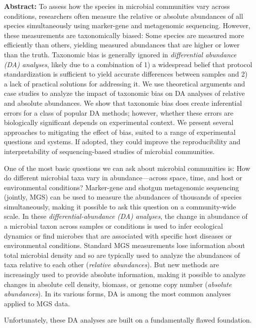 \documentclass[
]{article}
\begin{document}
\leavevmode{}%
\textbf{Abstract:}
To assess how the species in microbial communities vary across conditions, researchers often measure the relative or absolute abundances of all species simultaneously using marker-gene and metagenomic sequencing.
However, these measurements are taxonomically biased: Some species are measured more efficiently than others, yielding measured abundances that are higher or lower than the truth.
Taxonomic bias is generally ignored in \emph{differential abundance (DA) analyses}, likely due to a combination of 1) a widespread belief that protocol standardization is sufficient to yield accurate differences between samples and 2) a lack of practical solutions for addressing it.
We use theoretical arguments and case studies to analyze the impact of taxonomic bias on DA analyses of relative and absolute abundances.
We show that taxonomic bias does create inferential errors for a class of popular DA methods; however, whether these errors are biologically significant depends on experimental context.
We present several approaches to mitigating the effect of bias, suited to a range of experimental questions and systems.
If adopted, they could improve the reproducibility and interpretability of sequencing-based studies of microbial communities.

One of the most basic questions we can ask about microbial communities is: How do different microbial taxa vary in abundance---across space, time, and host or environmental conditions?
Marker-gene and shotgun metagenomic sequencing (jointly, MGS) can be used to measure the abundances of thousands of species simultaneously, making it possible to ask this question on a community-wide scale.
In these \emph{differential-abundance (DA) analyses}, the change in abundance of a microbial taxon across samples or conditions is used to infer ecological dynamics or find microbes that are associated with specific host diseases or environmental conditions.
Standard MGS measurements lose information about total microbial density and so are typically used to analyze the abundances of taxa relative to each other (\emph{relative abundances}).
But new methods are increasingly used to provide absolute information, making it possible to analyze changes in absolute cell density, biomass, or genome copy number (\emph{absolute abundances}).
In its various forms, DA is among the most common analyses applied to MGS data.

Unfortunately, these DA analyses are built on a fundamentally flawed foundation.
\end{document}
